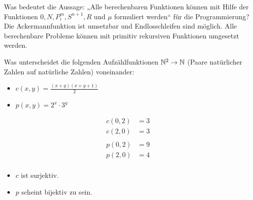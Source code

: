 \begin{card}
  Was bedeutet die Aussage: „Alle berechenbaren Funktionen können mit Hilfe der Funktionen $0, N, P^m_i, S^{n+1}, R$ und $\mu$ formuliert werden“ für die Programmierung?
  \hr
  Die Ackermannfunktion ist umsetzbar und Endlosschleifen sind möglich. Alle berechenbare Probleme können mit primitiv rekursiven Funktionen umgesetzt werden.
\end{card}

\begin{card}
  Was unterscheidet die folgenden Aufzählfunktionen $\mathbb{N}^2 \rightarrow \mathbb{N}$ (Paare natürlicher Zahlen auf natürliche Zahlen) voneinander:
  \begin{itemize}
    \item $c(x, y) = \frac{(x + y)(x + y + 1)}{2}$
    \item $p(x, y) = 2^x \cdot 3^y$
  \end{itemize}
  \hr
  \begin{align*}
    c(0,2) &= 3 \\
    c(2,0) &= 3 \\
    \\
    p(0,2) &= 9 \\
    p(2,0) &= 4 \\
  \end{align*}

  \begin{itemize}
    \item $c$ ist surjektiv.
    \item $p$ scheint bijektiv zu sein.
  \end{itemize}
\end{card}
